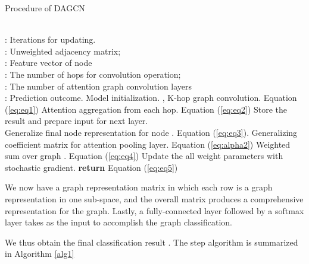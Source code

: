 \documentclass[conference]{IEEEtran}
\begin{document}
		
		
		\begin{algorithm}[!h]
            \caption{Procedure of DAGCN} 
            \label{alg1}
            \begin{algorithmic}[1]
                \REQUIRE ~~\\
                    : Iterations for updating. \\
                    : Unweighted adjacency matrix; \\
                    : Feature vector of node  \\
                    : The number of hops for convolution operation; \\
                    : The number of attention graph convolution layers 
                \ENSURE  ~~\\
                    : Prediction outcome. 
                \STATE Model initialization. ,  
                            \STATE K-hop graph convolution. Equation (\ref{eq:eq1})
                        \ENDFOR
                        \STATE Attention aggregation from each hop. Equation (\ref{eq:eq2})
                        \STATE Store the result and prepare input for next layer. \\
                           
                    \ENDFOR
                    \STATE Generalize final node representation  for node . Equation (\ref{eq:eq3}). 
                    \STATE Generalizing coefficient matrix for attention pooling layer.  Equation (\ref{eq:alpha2})
                    \STATE Weighted sum over graph . Equation (\ref{eq:eq4})
                    \STATE Update the all weight parameters with stochastic gradient.
                \ENDFOR
                \STATE \textbf{return}   Equation (\ref{eq:eq5})
            \end{algorithmic}
        \end{algorithm}
		
		We now have a graph representation matrix in which each row is a graph representation in one sub-space, and the overall matrix produces a comprehensive representation for the graph. Lastly, a fully-connected layer followed by a softmax layer takes  as the input to accomplish the graph classification. 
		
		
		
		We thus obtain the final classification result . The step algorithm is summarized in Algorithm \ref{alg1}
		
\end{document}
